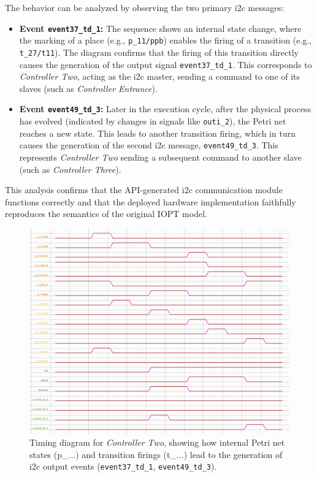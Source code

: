 The behavior can be analyzed by observing the two primary \gls{i2c} messages:
\begin{itemize}
    \item \textbf{Event \texttt{event37\_td\_1}:} The sequence shows an internal state change, where the marking of a place (e.g., \texttt{p\_11/ppb}) enables the firing of a transition (e.g., \texttt{t\_27/t11}). The diagram confirms that the firing of this transition directly causes the generation of the output signal \texttt{event37\_td\_1}. This corresponds to \textit{Controller Two}, acting as the \gls{i2c} master, sending a command to one of its slaves (such as \textit{Controller Entrance}).

    \item \textbf{Event \texttt{event49\_td\_3}:} Later in the execution cycle, after the physical process has evolved (indicated by changes in signals like \texttt{outi\_2}), the Petri net reaches a new state. This leads to another transition firing, which in turn causes the generation of the second \gls{i2c} message, \texttt{event49\_td\_3}. This represents \textit{Controller Two} sending a subsequent command to another slave (such as \textit{Controller Three}).
\end{itemize}

This analysis confirms that the API-generated \gls{i2c} communication module functions correctly and that the deployed hardware implementation faithfully reproduces the semantics of the original IOPT model.


\begin{figure}[htb!]
    \centering
    \includegraphics[width=\columnwidth]{Chapters/Figures/timing_diagram_controller2.png}
    \caption{Timing diagram for \textit{Controller Two}, showing how internal Petri net states (p\_...) and transition firings (t\_...) lead to the generation of \gls{i2c} output events (\texttt{event37\_td\_1}, \texttt{event49\_td\_3}).}
    \label{fig:timing_diagram_controller2}
\end{figure}



